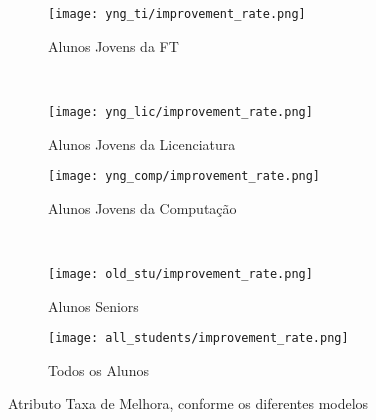 \clearpage
\begin{figure}[!ht]
    \centering
    \begin{subfigure}[b]{0.48\textwidth}
        \centering
        \texttt{[image: yng\_ti/improvement\_rate.png]}
        \caption{Alunos Jovens da FT}
    \end{subfigure}
    ~
    \begin{subfigure}[b]{0.48\textwidth}
        \centering
        \texttt{[image: yng\_lic/improvement\_rate.png]}
        \caption{Alunos Jovens da Licenciatura}
    \end{subfigure}

    \begin{subfigure}[b]{0.48\textwidth}
        \centering
        \texttt{[image: yng\_comp/improvement\_rate.png]}
        \caption{Alunos Jovens da Computação}
    \end{subfigure}
    ~
    \begin{subfigure}[b]{0.48\textwidth}
        \centering
        \texttt{[image: old\_stu/improvement\_rate.png]}
        \caption{Alunos Seniors}
    \end{subfigure}

    \begin{subfigure}[b]{0.48\textwidth}
        \centering
        \texttt{[image: all\_students/improvement\_rate.png]}
        \caption{Todos os Alunos}
    \end{subfigure}
    \caption{Atributo Taxa de Melhora, conforme os diferentes modelos}
\end{figure}

